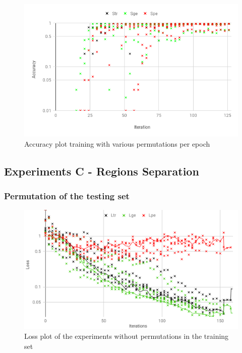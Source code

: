 \begin{enumerate}[label=(\Alph*)]
        \begin{figure}[H]
            \centering
            \includegraphics[width=.9\linewidth]{fig/content/results/shortest_path/various_perms_per_epoch_ACC.png}
            \caption{Accuracy plot training with various permutations per epoch}
            \label{fig:shotest_paths_varios_perms_ACC_results}
        \end{figure}

    \end{enumerate}
    
\subsection{Experiments C - Regions Separation}

\subsubsection {Permutation of the testing set}

\begin{figure}[H]
    \centering
    \includegraphics[width=.9\linewidth]
    {fig/content/results/shapes/base/loss.png}
    \caption{Loss plot of the experiments without permutations in the training set}
    \label{fig:regions_separation_base_loss}
\end{figure}

